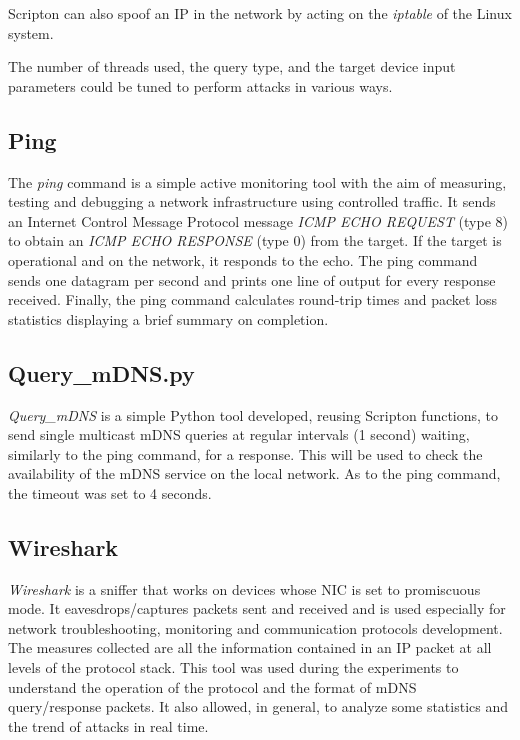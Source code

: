 \documentclass[fleqn, 11pt]{SelfArx} %
\begin{document}
Scripton can also spoof an IP in the network by acting on the \textit{iptable} of the Linux system.

The number of threads used, the query type, and the target device input parameters could be tuned to perform attacks in various ways.

\subsection{Ping}
The \textit {ping} \cite{pingManPage} command is a simple active monitoring tool with the aim of measuring, testing and debugging a network infrastructure using controlled traffic. It sends an Internet Control Message Protocol message \textit{ICMP ECHO REQUEST} (type 8) to obtain an \textit{ICMP ECHO RESPONSE} (type 0) from the target. If the target is operational and on the network, it responds to the echo. The ping command sends one datagram per second and prints one line of output for every response received. Finally, the ping command calculates round-trip times and packet loss statistics displaying a brief summary on completion.

\subsection{Query\_mDNS.py}
\label{sec:query-mdns-script}
\textit{Query\_mDNS} is a simple Python tool developed, reusing Scripton functions, to send single multicast mDNS queries at regular intervals (1 second) waiting, similarly to the ping command, for a response. This will be used to check the availability of the mDNS service on the local network.\newline
As to the ping command, the timeout was set to 4 seconds.

\subsection{Wireshark}
\textit{Wireshark} is a sniffer that works on devices whose NIC is set to promiscuous mode. It eavesdrops/captures packets sent and received and is used especially for network troubleshooting, monitoring and communication protocols development. The measures collected are all the information contained in an IP packet at all levels of the protocol stack. \newline
This tool was used during the experiments to understand the operation of the protocol and the format of mDNS query/response packets. \newline
It also allowed, in general, to analyze some statistics and the trend of attacks in real time.\newline
\end{document}

